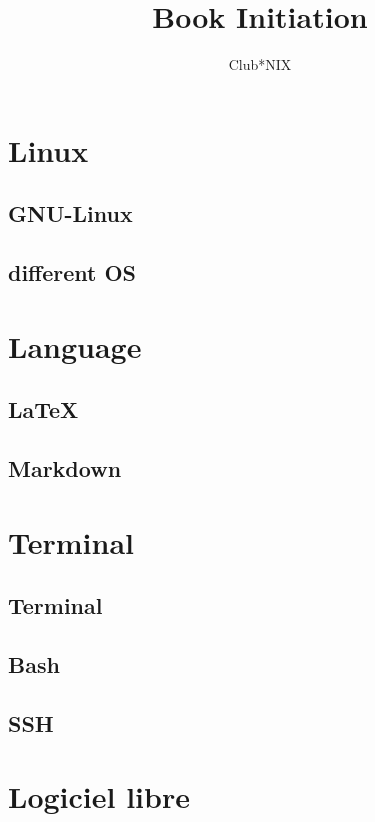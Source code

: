 \documentclass[a4paper]{report}
\title{Book Initiation}
\author{Club*NIX}
\begin{document}
\maketitle

\tableofcontents
\newpage


\chapter{Linux}
 \section{GNU-Linux}
    
 \section{different OS}
    
    
\chapter{Language}
  \section{LaTeX}
    
  \section{Markdown}
    
    
\chapter{Terminal}
  \section{Terminal}
    
  \section{Bash}
    
  \section{SSH}
    
    
\chapter{Logiciel libre}
	
\end{document}
